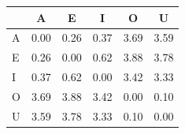 \begin{tabular}{lccccc}
\toprule
\rowcolor{col01}
 & A & E & I & O & U \\
\midrule
A & 0.00 & 0.26 & 0.37 & 3.69 & 3.59 \\
E & 0.26 & 0.00 & 0.62 & 3.88 & 3.78 \\
I & 0.37 & 0.62 & 0.00 & 3.42 & 3.33 \\
O & 3.69 & 3.88 & 3.42 & 0.00 & 0.10 \\
U & 3.59 & 3.78 & 3.33 & 0.10 & 0.00 \\
\bottomrule
\end{tabular}
